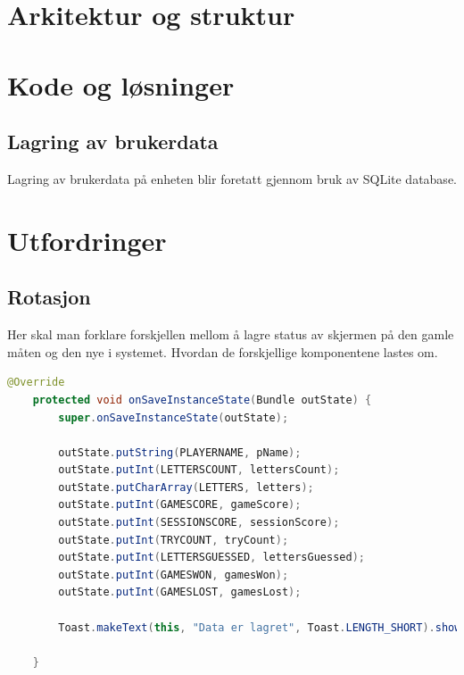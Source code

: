 \chapter{Arkitektur og struktur}

\chapter{Kode og løsninger}

\section{Lagring av brukerdata}
Lagring av brukerdata på enheten blir foretatt gjennom bruk av SQLite database. 

\chapter{Utfordringer}
\section{Rotasjon}
Her skal man forklare forskjellen mellom å lagre status av skjermen på den gamle måten og den nye i systemet. Hvordan de forskjellige komponentene lastes om. 
\begin{lstlisting}[language=Java]
    @Override
    protected void onSaveInstanceState(Bundle outState) {
        super.onSaveInstanceState(outState);

        outState.putString(PLAYERNAME, pName);
        outState.putInt(LETTERSCOUNT, lettersCount);
        outState.putCharArray(LETTERS, letters);
        outState.putInt(GAMESCORE, gameScore);
        outState.putInt(SESSIONSCORE, sessionScore);
        outState.putInt(TRYCOUNT, tryCount);
        outState.putInt(LETTERSGUESSED, lettersGuessed);
        outState.putInt(GAMESWON, gamesWon);
        outState.putInt(GAMESLOST, gamesLost);

        Toast.makeText(this, "Data er lagret", Toast.LENGTH_SHORT).show();

    }
\end{lstlisting}

